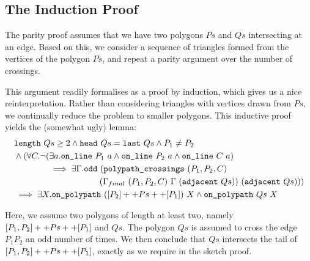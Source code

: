 \subsection{The Induction Proof}\label{sec:InductionProof}
The parity proof assumes that we have two polygons $Ps$ and $Qs$ intersecting at an edge. Based on this, we consider a sequence of triangles formed from the vertices of the polygon $Ps$, and repeat a parity argument over the number of crossings.

This argument readily formalises as a proof by induction, which gives us a nice reinterpretation. Rather than considering triangles with vertices drawn from $Ps$, we continually reduce the problem to smaller polygons. This inductive proof yields the (somewhat ugly) lemma:
\begin{equation}\label{eq:oddCrossClosedPolypath}
  \begin{aligned}
    &\texttt{length}\ Qs \geq 2 \wedge \texttt{head}\ Qs = \texttt{last}\ Qs\wedge P_1\neq P_2\\
    &\wedge (\forall C. \neg(\exists a.\texttt{on\_line}\ P_1\ a\wedge \texttt{on\_line}\ P_2\ a\wedge \texttt{on\_line}\ C\ a)\\
    &\qquad\qquad \implies \exists \Gamma. \texttt{odd}\ (\texttt{polypath\_crossings}\ (P_1,P_2,C)\\
    &\qquad\qquad\qquad\qquad\qquad(\Gamma_{final}\ (P_1,P_2,C)\ \Gamma\ (\texttt{adjacent}\ Qs))\ (\texttt{adjacent}\ Qs)))\\
    &\implies\exists X. \texttt{on\_polypath}\ ([P_2] ++ Ps ++ [P_1])\ X \wedge \texttt{on\_polypath}\ Qs\ X
  \end{aligned}
\end{equation}

Here, we assume two polygons of length at least two, namely $[P_1,P_2] ++ Ps ++ [P_1]$ and $Qs$. The polygon $Qs$ is assumed to cross the edge $P_1P_2$ an odd number of times. We then conclude that $Qs$ intersects the tail of $[P_1,P_2] ++ Ps ++ [P_1]$, exactly as we require in the sketch proof.

